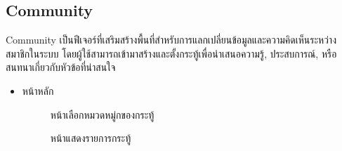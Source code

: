 \subsection {Community}
Community เป็นฟีเจอร์ที่เสริมสร้างพื้นที่สำหรับการแลกเปลี่ยนข้อมูลและความคิดเห็นระหว่างสมาชิกในระบบ โดยผู้ใช้สามารถเข้ามาสร้างและตั้งกระทู้เพื่อนำเสนอความรู้, ประสบการณ์, หรือสนทนาเกี่ยวกับหัวข้อที่น่าสนใจ\begin{itemize}
    \item หน้าหลัก
    \begin{figure}[H]\centering
    \setlength{\fboxrule}{0.2mm} %
    \setlength{\fboxsep}{0.5cm}
  \caption{\centering หน้าเลือกหมวดหมู่กของกระทู้}\label{fig:wireframe5_1}
  \end{figure}
   \begin{figure}[H]\centering
    \setlength{\fboxrule}{0.2mm} %
    \setlength{\fboxsep}{0.5cm}
  \caption{\centering หน้าแสดงรายการกระทู้}\label{fig:wireframe5_2}
  \end{figure}


\end{itemize}
